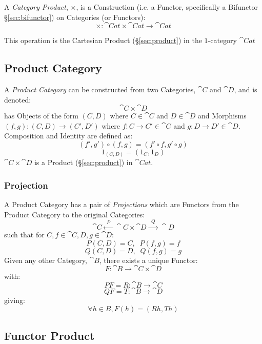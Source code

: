 A \emph{Category Product}, $\times$, is a Construction (i.e. a Functor,
specifically a Bifunctor \S\ref{sec:bifunctor}) on Categories (or
Functors):
\[
  \times : \cat{Cat} \times \cat{Cat} \rightarrow \cat{Cat}
\]

This operation is the Cartesian Product (\S\ref{sec:product}) in the
$1$-category $\cat{Cat}$



\subsection{Product Category}\label{sec:product_category}

A \emph{Product Category} can be constructed from two Categories,
$\cat{C}$ and $\cat{D}$, and is denoted:
\[
  \cat{C} \times \cat{D}
\]
has Objects of the form $(C,D)$ where $C \in \cat{C}$ and $D \in
\cat{D}$ and Morphisms $(f,g) : (C,D) \rightarrow (C',D')$ where $f
: C \rightarrow C' \in \cat{C}$ and $g : D \rightarrow D' \in
\cat{D}$. Composition and Identity are defined as:
\[
  (f',g') \circ (f,g) = (f' \circ f,g' \circ g)
\]\[
  1_{(C,D)} = (1_C, 1_D)
\]
$\cat{C} \times \cat{D}$ is a Product (\S\ref{sec:product}) in
$\cat{Cat}$.



\subsubsection{Projection}\label{sec:projection_functor}

A Product Category has a pair of \emph{Projections} which are Functors
from the Product Category to the original Categories:
\[
  \cat{C} \xleftarrow{\;\; P\;\;} \cat{C}\times\cat{D}
  \xrightarrow{\;\; Q\;\;} \cat{D}
\]
such that for $C,f \in \cat{C}, D,g \in \cat{D}$:
\[
  P(C,D) = C, \;\; P(f,g) = f
\]\[
  Q(C,D) = D, \;\; Q(f,g) = g
\]
Given any other Category, $\cat{B}$, there exists a unique Functor:
\[
  F : \cat{B} \rightarrow \cat{C} \times \cat{D}
\]
with:
\[
  PF = R : \cat{B} \rightarrow \cat{C}
\]\[
  QF = T : \cat{B} \rightarrow \cat{D}
\]
giving:
\[
  \forall h \in B, F(h) = (Rh,Th)
\]



\subsection{Functor Product}\label{sec:functor_product}

